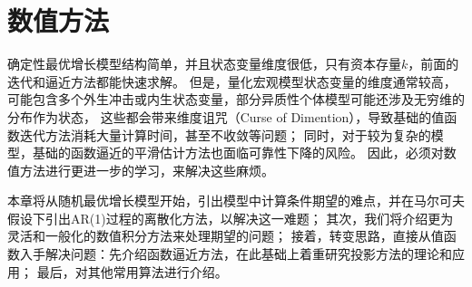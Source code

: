 

\chapter{数值方法}  \label{ch-numerical-methods}

确定性最优增长模型结构简单，并且状态变量维度很低，只有资本存量$k$，前面的迭代和逼近方法都能快速求解。
但是，量化宏观模型状态变量的维度通常较高，可能包含多个外生冲击或内生状态变量，部分异质性个体模型可能还涉及无穷维的分布作为状态，
这些都会带来维度诅咒（Curse of Dimention），导致基础的值函数迭代方法消耗大量计算时间，甚至不收敛等问题；
同时，对于较为复杂的模型，基础的函数逼近的平滑估计方法也面临可靠性下降的风险。
因此，必须对数值方法进行更进一步的学习，来解决这些麻烦。

本章将从随机最优增长模型开始，引出模型中计算条件期望的难点，并在马尔可夫假设下引出AR(1)过程的离散化方法，以解决这一难题；
其次，我们将介绍更为灵活和一般化的数值积分方法来处理期望的问题；
接着，转变思路，直接从值函数入手解决问题：先介绍函数逼近方法，在此基础上着重研究投影方法的理论和应用；
最后，对其他常用算法进行介绍。






























